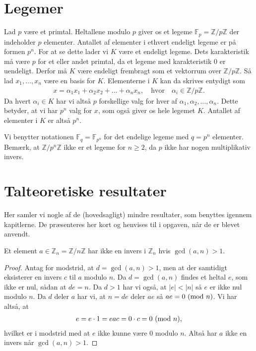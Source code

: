 \appendix
\chapter{Legemer}
Lad $p$ være et primtal. Heltallene modulo $p$ giver os et legeme $\mathbb{F}_p = \mathbb{Z}/p\mathbb{Z}$ der indeholder $p$ elementer. Antallet af elementer i ethvert endeligt legeme er på formen $p^n$. For at se dette lader vi $K$ være et endeligt legeme. Dets karakteristik må være $p$ for et eller andet primtal, da et legeme med karakteristik $0$ er uendeligt. Derfor må $K$ være endeligt frembragt som et vektorrum over $\mathbb{Z}/p\mathbb{Z}$. Så lad $x_1, \ldots, x_n$ være en basis for $K$. Elementerne i $K$ kan da skrives entydigt som
\begin{align*}
	x= \alpha_1 x_1 + \alpha_2 x_2 + \ldots + \alpha_n x_n, \quad \text{hvor} \quad \alpha_i \in \mathbb{Z}/p\mathbb{Z}.
\end{align*}
Da hvert $\alpha_i \in K$ har vi altså $p$ forskellige valg for hver af $\alpha_1, \alpha_2, \ldots, \alpha_n$. Dette betyder, at vi har $p^n$ valg for $x$, som også giver os hele legemet $K$. Antallet af elementer i $K$ er altså $p^n$. 

Vi benytter notationen $\mathbb{F}_q = \mathbb{F}_{p^n}$ for det endelige legeme med $q=p^n$ elementer. Bemærk, at $\mathbb{Z}/p^n \mathbb{Z}$ ikke er et legeme for $n \geq 2$, da $p$ ikke har nogen multiplikativ invers.



\chapter{Talteoretiske resultater}
Her samler vi nogle af de (hovedsagligt) mindre resultater, som benyttes igennem kapitlerne. De præsenteres her kort og henvises til  i opgaven, når de er blevet anvendt.

\begin{proposition}
\label{inverse_exists_not}
Et element $a \in \mathbb{Z}_n = \mathbb{Z}/n\mathbb{Z}$ har ikke en invers i $\mathbb{Z}_n$ hvis $\gcd(a, n) > 1$. 
\end{proposition}
\begin{proof}
Antag for modstrid, at $d = \gcd(a, n) > 1$, men at der samtidigt eksisterer en invers $c$ til $a$ modulo $n$. Da $d = \gcd(a, n)$ findes et heltal $e$, som ikke er nul, sådan at $de = n$. Da $d >1$ har vi også, at $|e| < |n|$ så $e$ er ikke nul modulo $n$. Da $d$ deler $a$ har vi, at $n = de$ deler $ae$ så $ae = 0 \ (\mathrm{mod} \ n)$. Vi har altså, at
\begin{align*}
	e = e \cdot 1 = eac = 0 \cdot c = 0 \ (\mathrm{mod} \ n),
\end{align*}
hvilket er i modstrid med at $e$ ikke kunne være $0$ modulo $n$. Altså har $a$ ikke en invers når $\gcd(a, n) > 1$.
\end{proof}

